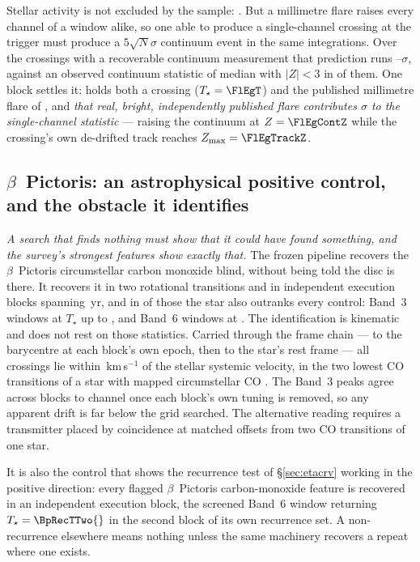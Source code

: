 Stellar activity is not excluded by the sample: \HostActiveClause
\citep{AstudilloDefru2017}. But a millimetre flare raises every channel of a
window alike, so one able to produce a single-channel crossing at the trigger
must produce a $5\sqrt{N}\sigma$ continuum event in the same integrations.
Over the \FlNCont{} crossings with a recoverable continuum measurement that
prediction runs \FlPredLo--\FlPredHi$\sigma$, against an observed continuum
statistic of median \FlObsMed{} with $|Z|<3$ in \FlNQuiet{} of them. One
block settles it: \FlEgStar{} \texttt{\FlEgEb} holds both a crossing
($T_\star=\FlEgT$) and the published millimetre flare of
\citet{MacGregor2020}, and \emph{that real, bright, independently published
flare contributes \FlEgContrib$\sigma$ to the single-channel statistic} ---
raising the continuum at $Z=\FlEgContZ$ while the crossing's own de-drifted
track reaches $Z_{\max}=\FlEgTrackZ$.

\subsection{$\beta$~Pictoris: an astrophysical positive control, and the
obstacle it identifies} \label{sec:bpicval}

\emph{A search that finds nothing must show that it could have found
something, and the survey's strongest features show exactly that.} The
frozen pipeline recovers the $\beta$~Pictoris circumstellar carbon monoxide
blind, without being told the disc is there. It recovers it in two
rotational transitions and in \CsBpCoBlocks{} independent execution
blocks spanning \BpBaselineYr\,yr, and in \NStageOneBpicEb{} of those the
star also outranks every control: \BpicNFlagThree{} Band~3 windows at
$T_\star$ up to \BpicBThreeTsym, and \BpicNFlagSix{} Band~6 windows at
\BpicBSixTsym. The identification is kinematic and does not rest on those
statistics. Carried through the frame chain --- to the barycentre at each
block's own epoch, then to the star's rest frame --- all \BpicPanelNCo{}
crossings lie within \BpicDvCoHi\,km\,s$^{-1}$ of the stellar systemic
velocity, in the two lowest CO transitions of a star with mapped
circumstellar CO \citep{Dent2014,Matra2017}. The Band~3 peaks agree across blocks to
\BpRecThreeTuneChanMax{} channel once each block's own tuning is removed, so
any apparent drift is far below the grid searched. The alternative reading
requires a transmitter placed by coincidence at matched offsets from two CO
transitions of one star.

It is also the control that shows the recurrence test of
\S\ref{sec:etacrv} working in the positive direction: every flagged
$\beta$~Pictoris carbon-monoxide feature is recovered in an independent
execution block, the screened Band~6 window returning
$T_\star=\BpRecTTwo{}$ in the second block of its own recurrence set. A
non-recurrence elsewhere means nothing unless the same machinery recovers a
repeat where one exists.


